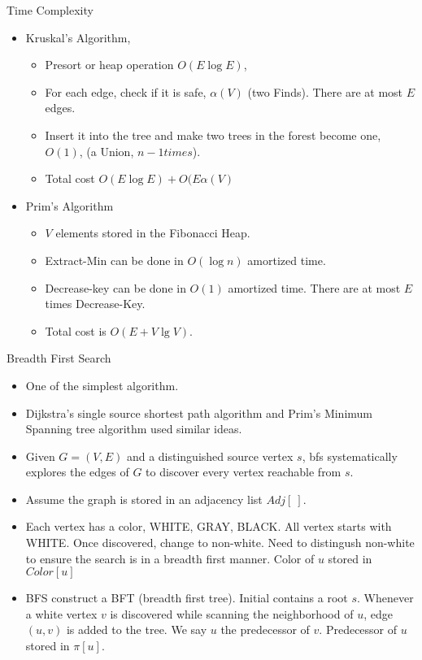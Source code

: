 \documentclass{beamer}
\begin{document}
\begin{frame}{}

\centerline{Time Complexity}
\begin{itemize}
\item Kruskal's Algorithm,
\begin{itemize} 
\item Presort or heap operation $O(E\log E)$,
\item For each edge, check if it is safe, $\alpha(V)$ (two {\sc Find}s). There are at most $E$ edges. 
\item Insert it into the tree and make two trees in the forest become one, $O(1)$, (a {\sc Union}, $n-1 times$).
\item Total cost $O(E\log E) + O(E\alpha(V)$
\end{itemize}
\item Prim's Algorithm
\begin{itemize}
\item $V$ elements stored in the Fibonacci Heap. 
\item {\sc Extract-Min} can be done in $O(\log n)$ amortized time. 
\item {\sc Decrease-key} can be done in $O(1)$ amortized time. There are at most $E$ times {\sc Decrease-Key}. 
\item Total cost is $O(E+V\lg V)$.
\end{itemize}
\end{itemize}
\end{frame}

\begin{frame}{Breadth First Search}
\begin{itemize}
\item One of the simplest algorithm.
\item Dijkstra's single source shortest path algorithm and
 Prim's Minimum Spanning tree algorithm used similar ideas. 
\item Given $G=(V,E)$ and a distinguished source vertex $s$, bfs systematically
 explores the edges of $G$ to discover every vertex reachable from $s$.  
\end{itemize}
\end{frame}

\begin{frame}{}

\begin{itemize}
\item Assume the graph is stored in an adjacency list $Adj[\ ]$. 
\item Each vertex has a color, WHITE, GRAY, BLACK.  All vertex starts
 with WHITE.  Once discovered, change to non-white.  Need to distingush
 non-white to ensure the search is in a breadth first manner. Color of
 $u$ stored in $Color[u]$ 
\item BFS construct a BFT (breadth first tree).   Initial contains a root $s$.
 Whenever a white vertex $v$ is discovered while scanning the neighborhood
 of $u$, edge $(u,v)$ is added to the tree.  We say $u$ the predecessor of
 $v$.  Predecessor of $u$ stored in $\pi[u]$.  
\end{itemize}
\end{frame}
\end{document}

